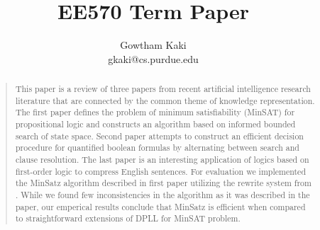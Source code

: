 \documentclass[letterpaper]{article}
\begin{document}
\title{EE570 Term Paper}
\author{Gowtham Kaki\\
gkaki@cs.purdue.edu\\
}

\maketitle

\begin{abstract}
\begin{quote}
This paper is a review of three papers from recent artificial intelligence
research literature that are connected by the common theme of knowledge
representation. The first paper \cite{minsat} defines the problem of minimum
satisfiability (MinSAT) for propositional logic and constructs an algorithm
based on informed bounded search of state space. Second paper \cite{qbf}
attempts to construct an efficient decision procedure for quantified boolean
formulas by alternating between search and clause resolution. The last paper
\cite{nlp} is an interesting application of logics based on first-order logic to
compress English sentences. For evaluation we implemented the MinSatz algorithm
described in first paper utilizing the rewrite system from
\cite{siskind-rewrite}. While we found few inconsistencies in the algorithm as
it was described in the paper, our emperical results conclude that MinSatz is
efficient when compared to straightforward extensions of DPLL for MinSAT
problem.
\end{quote}
\end{abstract}





\end{document}
